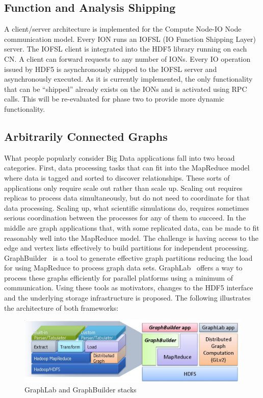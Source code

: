 \documentclass[conference]{IEEEtran}
\begin{document}
\subsection{Function and Analysis Shipping}
\label{sec:fn-shipping}

A client/server architecture is implemented for the Compute Node-IO Node
communication model.  Every ION runs an IOFSL (IO Function Shipping Layer)
server. The IOFSL client is integrated into the HDF5 library running on each
CN. A client can forward requests to any number of IONs. Every IO operation
issued by HDF5 is asynchronously shipped to the IOFSL server and asynchronously
executed. As it is currently implemented, the only functionality that can be
``shipped'' already exists on the IONs and is activated using RPC calls. This
will be re-evaluated for phase two to provide more dynamic functionality.

\subsection{Arbitrarily Connected Graphs}
\label{sec:acg}

What people popularly consider Big Data applications fall into two broad
categories. First, data processing tasks that can fit into the MapReduce model
where data is tagged and sorted to discover relationships. These sorts of
applications only require scale out rather than scale up. Scaling out requires
replicas to process data simultaneously, but do not need to coordinate for that
data processing. Scaling up, what scientific simulations do, requires sometimes
serious coordination between the processes for any of them to succeed. In the
middle are graph applications that, with some replicated data, can be made to
fit reasonably well into the MapReduce model. The challenge is having access to
the edge and vertex lists effectively to build partitions for independent
processing. GraphBuilder~\cite{Jain:2013:GraphBuilder} is a tool to generate
effective graph partitions reducing the load for using MapReduce to process
graph data sets. GraphLab~\cite{Low:2012:GraphLab} offers a way to process
these graphs efficiently for parallel platforms using a minimum of
communication. Using these tools as motivators, changes to the HDF5 interface
and the underlying storage infrastructure is proposed.  The following
illustrates the architecture of both frameworks:

\begin{figure}[htbp]
\centering
\vspace{-0.10in}
\includegraphics[width=\columnwidth]{images/graphlab-and-graphbuilder.png}
\vspace{-0.30in}
\caption{GraphLab and GraphBuilder stacks}
\label{fig:graphlab-graphbuilder}
\vspace{-0.10in}
\end{figure}
\end{document}
